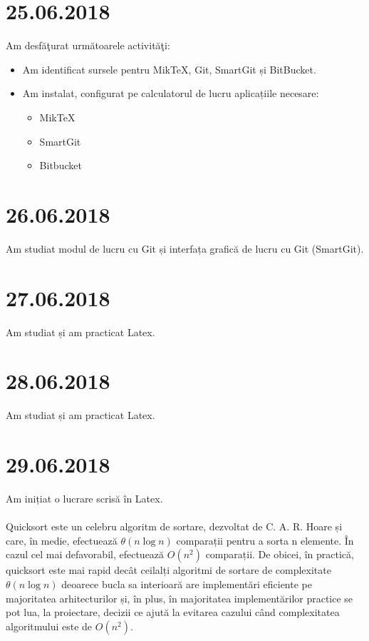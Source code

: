 \documentclass{report}
\begin{document}
\chapter{25.06.2018}
Am desfăţurat următoarele activităţi:
\begin{itemize}
\item
Am identificat sursele pentru MikTeX, Git, SmartGit și BitBucket.

\item
Am instalat, configurat pe calculatorul de lucru aplicațiile necesare:
\begin{itemize}
\item
MikTeX
\item
SmartGit
\item
Bitbucket
\end{itemize}


\end{itemize}



\chapter{26.06.2018}
Am studiat modul de lucru cu Git și interfața grafică de lucru cu Git (SmartGit).
\chapter{27.06.2018}
Am studiat și am practicat Latex.
\chapter{28.06.2018}
Am studiat și am practicat Latex.
\chapter{29.06.2018}
Am inițiat o lucrare scrisă în Latex.\\
\\


	Quicksort este un celebru algoritm de sortare, dezvoltat de C. A. R. Hoare și care, în medie, efectuează ${\displaystyle \theta (n\log {n})}$ comparații pentru a sorta n elemente. În cazul cel mai defavorabil, efectuează ${\displaystyle O(n^{2})}$ comparații. De obicei, în practică, quicksort este mai rapid decât ceilalți algoritmi de sortare de complexitate ${\displaystyle \theta (n\log {n})}$ deoarece bucla sa interioară are implementări eficiente pe majoritatea arhitecturilor și, în plus, în majoritatea implementărilor practice se pot lua, la proiectare, decizii ce ajută la evitarea cazului când complexitatea algoritmului este de ${\displaystyle O(n^{2})}$.\\
    \\
\end{document}
